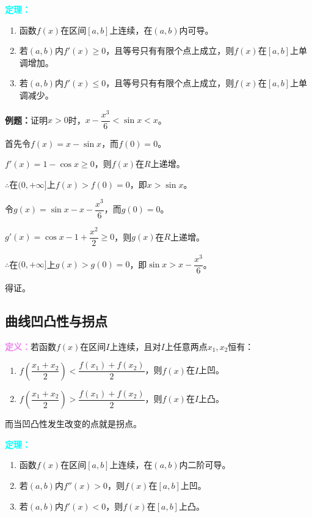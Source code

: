 \documentclass[UTF8, 12pt]{ctexart}
\begin{document}
\textcolor{aqua}{\textbf{定理：}}

\begin{enumerate}
    \item 函数$f(x)$在区间$[a,b]$上连续，在$(a,b)$内可导。
    \item 若$(a,b)$内$f'(x)\geqslant 0$，且等号只有有限个点上成立，则$f(x)$在$[a,b]$上单调增加。
    \item 若$(a,b)$内$f'(x)\leqslant 0$，且等号只有有限个点上成立，则$f(x)$在$[a,b]$上单调减少。
\end{enumerate}

\textbf{例题：}证明$x>0$时，$x-\dfrac{x^3}{6}<\sin x<x$。

首先令$f(x)=x-\sin x$，而$f(0)=0$。

$f'(x)=1-\cos x\geqslant 0$，则$f(x)$在$R$上递增。

$\therefore$在$(0,+\infty]$上$f(x)>f(0)=0$，即$x>\sin x$。

令$g(x)=\sin x-x-\dfrac{x^3}{6}$，而$g(0)=0$。

$g'(x)=\cos x-1+\dfrac{x^2}{2}\geqslant 0$，则$g(x)$在$R$上递增。

$\therefore$在$(0,+\infty]$上$g(x)>g(0)=0$，即$\sin x>x-\dfrac{x^3}{6}$。

得证。

\subsection{曲线凹凸性与拐点}

\textcolor{violet}{\textbf{定义：}}若函数$f(x)$在区间$I$上连续，且对$I$上任意两点$x_1,x_2$恒有：

\begin{enumerate}
    \item $f(\dfrac{x_1+x_2}{2})<\dfrac{f(x_1)+f(x_2)}{2}$，则$f(x)$在$I$上凹。
    \item $f(\dfrac{x_1+x_2}{2})>\dfrac{f(x_1)+f(x_2)}{2}$，则$f(x)$在$I$上凸。
\end{enumerate}

而当凹凸性发生改变的点就是拐点。

\textcolor{aqua}{\textbf{定理：}}

\begin{enumerate}
    \item 函数$f(x)$在区间$[a,b]$上连续，在$(a,b)$内二阶可导。
    \item 若$(a,b)$内$f''(x)>0$，则$f(x)$在$[a,b]$上凹。
    \item 若$(a,b)$内$f'(x)<0$，则$f(x)$在$[a,b]$上凸。
\end{enumerate}
\end{document}
